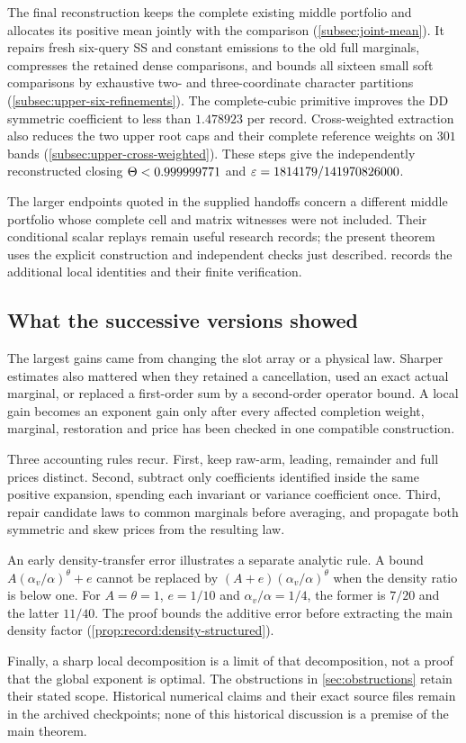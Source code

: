 The final reconstruction keeps the complete existing middle portfolio
and allocates its positive mean jointly with the comparison
(\cref{subsec:joint-mean}). It repairs fresh six-query SS and constant
emissions to the old full marginals, compresses the retained dense
comparisons, and bounds all sixteen small soft comparisons by exhaustive
two- and three-coordinate character partitions
(\cref{subsec:upper-six-refinements}). The complete-cubic primitive
improves the DD symmetric coefficient to less than $1.478923$ per
record. Cross-weighted extraction also reduces the two upper root
caps and their complete reference weights on $301$ bands
(\cref{subsec:upper-cross-weighted}). These steps give the independently reconstructed closing
$\Theta<0.999999771$ and $\varepsilon=1814179/141970826000$.

The larger endpoints quoted in the supplied handoffs concern a different
middle portfolio whose complete cell and matrix witnesses were not
included. Their conditional scalar replays remain useful research
records; the present theorem uses the explicit construction and
independent checks just described.  records the
additional local identities and their finite verification.

\subsection{What the successive versions showed}\label{subsec:history:lessons}

The largest gains came from changing the slot array or a physical law.
Sharper estimates also mattered when they retained a cancellation,
used an exact actual marginal, or replaced a first-order sum by a
second-order operator bound. A local gain becomes an exponent gain
only after every affected completion weight, marginal, restoration
and price has been checked in one compatible construction.

Three accounting rules recur. First, keep raw-arm, leading,
remainder and full prices distinct. Second, subtract only coefficients
identified inside the same positive expansion, spending each invariant
or variance coefficient once. Third, repair candidate laws to common
marginals before averaging, and propagate both symmetric and skew
prices from the resulting law.

An early density-transfer error illustrates a separate analytic rule.
A bound $A(\alpha_v/\alpha)^\theta+e$ cannot be replaced by
$(A+e)(\alpha_v/\alpha)^\theta$ when the density ratio is below one.
For $A=\theta=1$, $e=1/10$ and $\alpha_v/\alpha=1/4$, the former
is $7/20$ and the latter $11/40$. The proof bounds the additive
error before extracting the main density factor
(\cref{prop:record:density-structured}).

Finally, a sharp local decomposition is a limit of that decomposition,
not a proof that the global exponent is optimal. The obstructions in
\cref{sec:obstructions} retain their stated scope. Historical numerical
claims and their exact source files remain in the archived checkpoints;
none of this historical discussion is a premise of the main theorem.

